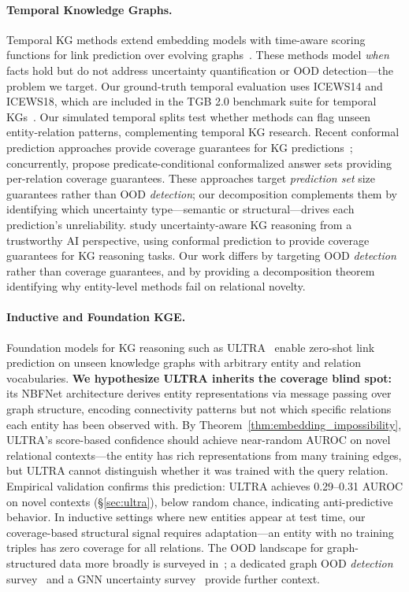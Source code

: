 \paragraph{Temporal Knowledge Graphs.}
Temporal KG methods extend embedding models with time-aware scoring functions for link prediction over evolving graphs~\citep{garcia2018learning,lacroix2020tensor}. These methods model \emph{when} facts hold but do not address uncertainty quantification or OOD detection---the problem we target. Our ground-truth temporal evaluation uses ICEWS14 and ICEWS18, which are included in the TGB 2.0 benchmark suite for temporal KGs~\citep{gastinger2024tgb2}. Our simulated temporal splits test whether methods can flag unseen entity-relation patterns, complementing temporal KG research.
Recent conformal prediction approaches provide coverage guarantees for KG predictions~\citep{zhu2025conformalized,zhu2025certainty}; concurrently, \citet{zhu2025condkgcp} propose predicate-conditional conformalized answer sets providing per-relation coverage guarantees. These approaches target \emph{prediction set} size guarantees rather than OOD \emph{detection}; our decomposition complements them by identifying which uncertainty type---semantic or structural---drives each prediction's unreliability.
\citet{ni2025trustworthy} study uncertainty-aware KG reasoning from a trustworthy AI perspective, using conformal prediction to provide coverage guarantees for KG reasoning tasks. Our work differs by targeting OOD \emph{detection} rather than coverage guarantees, and by providing a decomposition theorem identifying why entity-level methods fail on relational novelty.

\paragraph{Inductive and Foundation KGE.}
Foundation models for KG reasoning such as ULTRA~\citep{galkin2024ultra} enable zero-shot link prediction on unseen knowledge graphs with arbitrary entity and relation vocabularies. \textbf{We hypothesize ULTRA inherits the coverage blind spot:} its NBFNet architecture derives entity representations via message passing over graph structure, encoding connectivity patterns but not which specific relations each entity has been observed with. By Theorem~\ref{thm:embedding_impossibility}, ULTRA's score-based confidence should achieve near-random AUROC on novel relational contexts---the entity has rich representations from many training edges, but ULTRA cannot distinguish whether it was trained with the query relation. Empirical validation confirms this prediction: ULTRA achieves 0.29--0.31 AUROC on novel contexts (\S\ref{sec:ultra}), below random chance, indicating anti-predictive behavior. In inductive settings where new entities appear at test time, our coverage-based structural signal requires adaptation---an entity with no training triples has zero coverage for all relations. The OOD landscape for graph-structured data more broadly is surveyed in~\citet{li2022oodgraph}; a dedicated graph OOD \emph{detection} survey~\citep{cai2025ooddetection} and a GNN uncertainty survey~\citep{wang2024uncertainty} provide further context.

